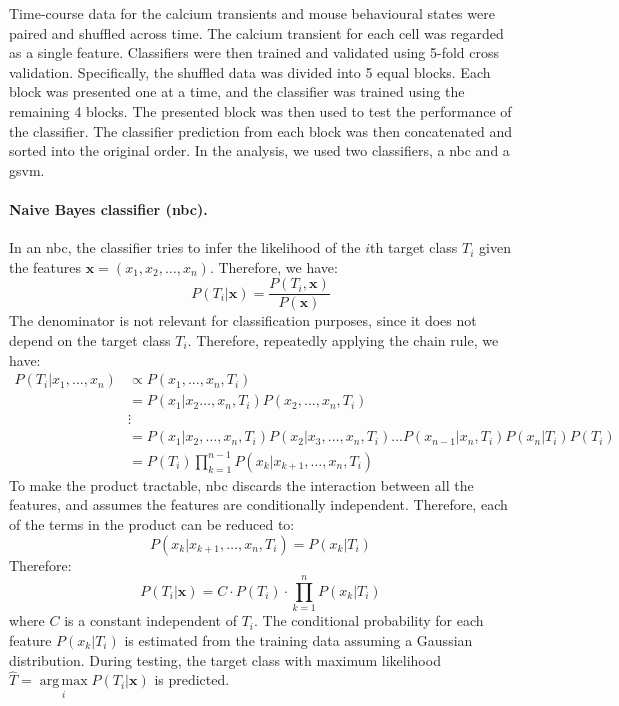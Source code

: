 Time-course data for the calcium transients and mouse behavioural states were paired and shuffled across time. The calcium transient for each cell was regarded as a single feature. Classifiers were then trained and validated using 5-fold cross validation. Specifically, the shuffled data was divided into 5 equal blocks. Each block was presented one at a time, and the classifier was trained using the remaining 4 blocks. The presented block was then used to test the performance of the classifier. The classifier prediction from each block was then concatenated and sorted into the original order. In the analysis, we used two classifiers, a \gls{nbc} and a \gls{gsvm}. 

\paragraph{Naive Bayes classifier (\gls{nbc}).}
In an \gls{nbc}, the classifier tries to infer the likelihood of the $i$th target class $T_i$ given the features $\mathbf{x} = (x_1, x_2, \dots, x_n)$. Therefore, we have:
\begin{equation*}
    P(T_i|\mathbf{x}) = \frac{P(T_i, \mathbf{x})}{P(\mathbf{x})}
\end{equation*}
The denominator is not relevant for classification purposes, since it does not depend on the target class $T_i$. Therefore, repeatedly applying the chain rule, we have:
\begin{align*}
    P(T_i|x_1, \dots, x_n) &\propto P(x_1, \dots, x_n, T_i) \\
                           &= P(x_1|x_2 \dots, x_n, T_i) P(x_2, \dots, x_n, T_i) \\
                           &\vdots \\
                           &= P(x_1|x_2, \dots, x_n, T_i)  P(x_2|x_3, \dots, x_n, T_i) \ldots  P(x_{n-1}|x_n, T_i)  P(x_n|T_i)  P(T_i) \\
                           &= P(T_i)  \prod_{k=1}^{n-1} P(x_k|x_{k+1}, \dots, x_n, T_i)
\end{align*}
To make the product tractable, \gls{nbc} discards the interaction between all the features, and assumes the features are conditionally independent. Therefore, each of the terms in the product can be reduced to:
\begin{equation*}
    P(x_k|x_{k+1}, \dots, x_n, T_i) = P(x_k|T_i)
\end{equation*}
Therefore:
\begin{equation*}
    P(T_i|\mathbf{x}) = C\cdot P(T_i) \cdot \prod_{k=1}^n P(x_k|T_i)
\end{equation*}
where $C$ is a constant independent of $T_i$. The conditional probability for each feature $P(x_k|T_i)$ is estimated from the training data assuming a Gaussian distribution. During testing, the target class with maximum likelihood $\hat{T}=\underset{i}{\operatorname{arg\,max}} P(T_i|\mathbf{x})$ is predicted.


